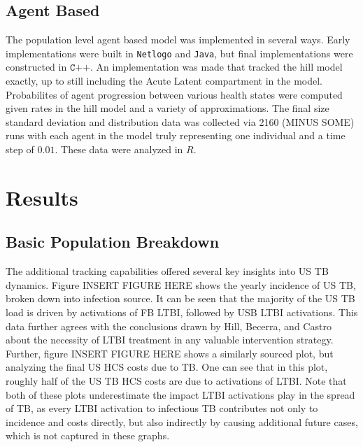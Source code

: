 \documentclass{amsart}
\begin{document}
\subsection{Agent Based}
The population level agent based model was implemented in several ways. Early
implementations were built in \texttt{Netlogo} and \texttt{Java}, but final
implementations were constructed in $\texttt{C++}$. An implementation was made
that tracked the hill model exactly, up to still including the Acute Latent
compartment in the model. Probabilites of agent progression between various
health states were computed given rates in the hill model and a variety of
approximations. The final size standard deviation and distribution data was
collected via 2160 (MINUS SOME) runs with each agent in the model truly
representing one individual and a time step of $0.01$. These data were analyzed
in $R$. 

\section{Results}

\subsection{Basic Population Breakdown}
The additional tracking capabilities offered several key insights into US TB
dynamics. Figure INSERT FIGURE HERE shows the yearly incidence of US TB, broken
down into infection source. It can be seen that the majority of the US TB load
is driven by activations of FB LTBI, followed by USB LTBI activations. This data
further agrees with the conclusions drawn by Hill, Becerra, and Castro about the
necessity of LTBI treatment in any valuable intervention strategy. Further,
figure INSERT FIGURE HERE shows a similarly sourced plot, but analyzing the
final US HCS costs due to TB. One can see that in this plot, roughly half of the
US TB HCS costs are due to activations of LTBI. Note that both of these plots
underestimate the impact LTBI activations play in the spread of TB, as every
LTBI activation to infectious TB contributes not only to incidence and costs
directly, but also indirectly by causing additional future cases, which is not
captured in these graphs. 
\end{document}
